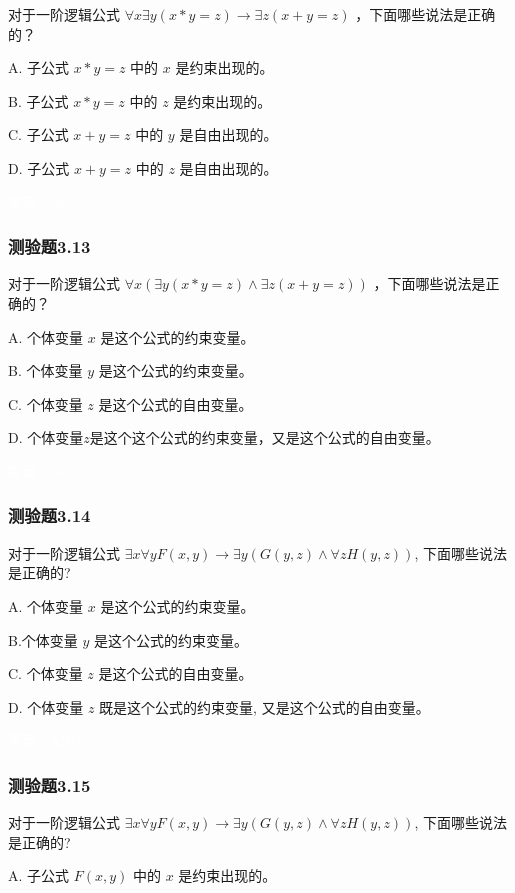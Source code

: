 \documentclass[UTF8, heading=true]{ctexart}
\begin{document}
对于一阶逻辑公式 $\forall x \exists y(x * y=z) \rightarrow \exists z(x+y=z)$ ，下面哪些说法是正确的？

A. 子公式 $x * y=z$ 中的 $x$ 是约束出现的。

B. 子公式 $x * y=z$ 中的 $z$ 是约束出现的。

C. 子公式 $x+y=z$ 中的 $y$ 是自由出现的。

D.  子公式 $x+y=z$ 中的 $z$ 是自由出现的。

\textcolor{white}{答案：AC}

\subsubsection{测验题3.13}

对于一阶逻辑公式 $\forall x(\exists y(x * y=z) \wedge \exists z(x+y=z))$ ，下面哪些说法是正确的？

A. 个体变量 $x$ 是这个公式的约束变量。

B. 个体变量 $y$ 是这个公式的约束变量。

C. 个体变量 $z$ 是这个公式的自由变量。

D.  个体变量$z$是这个这个公式的约束变量，又是这个公式的自由变量。

\textcolor{white}{答案：AC}

\subsubsection{测验题3.14}

对于一阶逻辑公式 $\exists x \forall y F(x, y) \rightarrow \exists y(G(y, z) \wedge \forall z H(y, z))$, 下面哪些说法是正确的?

A. 个体变量 $x$ 是这个公式的约束变量。

B.个体变量 $y$ 是这个公式的约束变量。

C. 个体变量 $z$ 是这个公式的自由变量。

D. 个体变量 $z$ 既是这个公式的约束变量, 又是这个公式的自由变量。

\textcolor{white}{答案：ABC}

\subsubsection{测验题3.15}

对于一阶逻辑公式 $\exists x \forall y F(x, y) \rightarrow \exists y(G(y, z) \wedge \forall z H(y, z))$, 下面哪些说法是正确的?

A. 子公式 $F(x, y)$ 中的 $x$ 是约束出现的。
\end{document}
